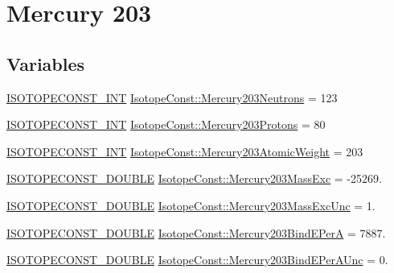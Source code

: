 \hypertarget{group___isotope_const-_mercury-_hg203}{}\section{Mercury 203}
\label{group___isotope_const-_mercury-_hg203}
\subsection*{Variables}
\begin{DoxyCompactItemize}
\item 
\mbox{\hyperlink{group___isotope_const-_macros_ga5f18360b3e99483a35c32d789e62621c}{I\+S\+O\+T\+O\+P\+E\+C\+O\+N\+S\+T\+\_\+\+I\+NT}} \mbox{\hyperlink{group___isotope_const-_mercury-_hg203_ga19fbdf64712722b4519cfa368f488b69}{Isotope\+Const\+::\+Mercury203\+Neutrons}} = 123
\item 
\mbox{\hyperlink{group___isotope_const-_macros_ga5f18360b3e99483a35c32d789e62621c}{I\+S\+O\+T\+O\+P\+E\+C\+O\+N\+S\+T\+\_\+\+I\+NT}} \mbox{\hyperlink{group___isotope_const-_mercury-_hg203_ga84f6c7c1ed03cdfc707d8a497b15703b}{Isotope\+Const\+::\+Mercury203\+Protons}} = 80
\item 
\mbox{\hyperlink{group___isotope_const-_macros_ga5f18360b3e99483a35c32d789e62621c}{I\+S\+O\+T\+O\+P\+E\+C\+O\+N\+S\+T\+\_\+\+I\+NT}} \mbox{\hyperlink{group___isotope_const-_mercury-_hg203_ga05fdedfea4a21eecf58c2a50eaaf6271}{Isotope\+Const\+::\+Mercury203\+Atomic\+Weight}} = 203
\item 
\mbox{\hyperlink{group___isotope_const-_macros_ga8f45a7272ce02c0b4c65c44636ed719a}{I\+S\+O\+T\+O\+P\+E\+C\+O\+N\+S\+T\+\_\+\+D\+O\+U\+B\+LE}} \mbox{\hyperlink{group___isotope_const-_mercury-_hg203_ga925712a549513a3954c8bddb649483d9}{Isotope\+Const\+::\+Mercury203\+Mass\+Exc}} = -\/25269.
\item 
\mbox{\hyperlink{group___isotope_const-_macros_ga8f45a7272ce02c0b4c65c44636ed719a}{I\+S\+O\+T\+O\+P\+E\+C\+O\+N\+S\+T\+\_\+\+D\+O\+U\+B\+LE}} \mbox{\hyperlink{group___isotope_const-_mercury-_hg203_ga912a3d615681bf330e31f18c750eeb9d}{Isotope\+Const\+::\+Mercury203\+Mass\+Exc\+Unc}} = 1.
\item 
\mbox{\hyperlink{group___isotope_const-_macros_ga8f45a7272ce02c0b4c65c44636ed719a}{I\+S\+O\+T\+O\+P\+E\+C\+O\+N\+S\+T\+\_\+\+D\+O\+U\+B\+LE}} \mbox{\hyperlink{group___isotope_const-_mercury-_hg203_ga49405ed0317b006a509cb71d67ed3252}{Isotope\+Const\+::\+Mercury203\+Bind\+E\+PerA}} = 7887.
\item 
\mbox{\hyperlink{group___isotope_const-_macros_ga8f45a7272ce02c0b4c65c44636ed719a}{I\+S\+O\+T\+O\+P\+E\+C\+O\+N\+S\+T\+\_\+\+D\+O\+U\+B\+LE}} \mbox{\hyperlink{group___isotope_const-_mercury-_hg203_ga31c80afb558cdf7d283d8d63e804652a}{Isotope\+Const\+::\+Mercury203\+Bind\+E\+Per\+A\+Unc}} = 0.

\end{DoxyCompactItemize}
